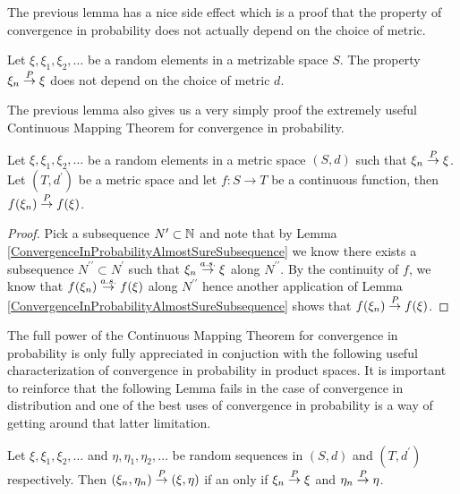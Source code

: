 The previous lemma has a nice side effect which is a proof that the
property of convergence in probability does not actually depend on the
choice of metric.
\begin{cor}\label{ConvergenceInProbabilityIndependentOfMetric}Let $\xi, \xi_1, \xi_2, \dots$ be a random elements in a
  metrizable space $S$.  The property $\xi_n \overset{P}\to \xi$ does not
  depend on the choice of metric $d$.
\end{cor}

The previous lemma also gives us a very simply proof the extremely
useful Continuous Mapping Theorem for convergence in probability.
\begin{lem}\label{ContinuousMappingProbability}Let $\xi, \xi_1, \xi_2, \dots$ be a random elements in a
  metric space $(S,d)$ such that $\xi_n \overset{P}\to \xi$.  Let
  $(T,d^\prime)$ be a metric space and let $f : S \to
  T$ be a continuous function, then $f(\xi_n) \overset{P}\to f(\xi)$.
\end{lem}
\begin{proof}
Pick a subsequence $N^\prime \subset \mathbb{N}$ and note that by Lemma
\ref{ConvergenceInProbabilityAlmostSureSubsequence} we know there
exists a subsequence $N^{\prime \prime} \subset N^\prime$ such that
$\xi_n \overset{a.s.}\to \xi$ along $N^{\prime \prime}$.  By the continuity of $f$,
we know that $f(\xi_n) \overset{a.s.}\to f(\xi)$ along $N^{\prime \prime}$ hence
another application of Lemma
\ref{ConvergenceInProbabilityAlmostSureSubsequence}  shows that
$f(\xi_n) \overset{P}\to f(\xi)$.
\end{proof}
The full power of the Continuous Mapping Theorem for convergence in
probability is only fully appreciated in conjuction with the following
useful characterization of convergence in probability in product
spaces.  It is important to reinforce that the following Lemma fails
in the case of convergence in distribution and one of the best uses of
convergence in probability is a way of getting around that latter
limitation.
\begin{lem}\label{ConvergenceInProbabilityInProductSpaces}Let $\xi, \xi_1, \xi_2, \dots$ and $\eta, \eta_1, \eta_2,
  \dots$ be random sequences in $(S,d)$ and $(T,d^\prime)$
  respectively.  Then $(\xi_n, \eta_n) \overset{P}\to (\xi, \eta)$ if an only
  if $\xi_n \overset{P}\to \xi$ and $\eta_n \overset{P}\to \eta$.
\end{lem}
